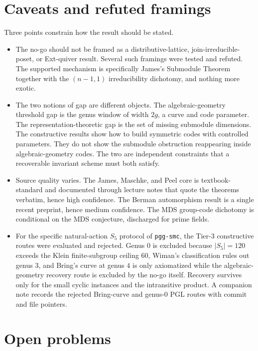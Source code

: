 \documentclass[11pt]{article}
\newcommand{\Sym}{S}
\begin{document}
\section{Caveats and refuted framings}

Three points constrain how the result should be stated.

\begin{itemize}[leftmargin=1.4em]
\item The no-go should not be framed as a distributive-lattice, join-irreducible-poset, or
  Ext-quiver result. Several such framings were tested and refuted. The supported mechanism
  is specifically James's Submodule Theorem together with the $(n-1,1)$ irreducibility
  dichotomy, and nothing more exotic.
\item The two notions of gap are different objects. The algebraic-geometry threshold gap is
  the genus window of width $2g$, a curve and code parameter. The representation-theoretic
  gap is the set of missing submodule dimensions. The constructive results show how to
  build symmetric codes with controlled parameters. They do not show the submodule
  obstruction reappearing inside algebraic-geometry codes. The two are independent
  constraints that a recoverable invariant scheme must both satisfy.
\item Source quality varies. The James, Maschke, and Peel core is textbook-standard and
  documented through lecture notes that quote the theorems verbatim, hence high confidence.
  The Berman automorphism result is a single recent preprint, hence medium confidence. The
  MDS group-code dichotomy is conditional on the MDS conjecture, discharged for prime
  fields.
\item For the specific natural-action $\Sym_5$ protocol of \texttt{pgg-smc}, the Tier-3
  constructive routes were evaluated and rejected. Genus $0$ is excluded because
  $|\Sym_5| = 120$ exceeds the Klein finite-subgroup ceiling $60$, Wiman's classification
  rules out genus $3$, and Bring's curve at genus $4$ is only axiomatized while the
  algebraic-geometry recovery route is excluded by the no-go itself. Recovery survives only
  for the small cyclic instances and the intransitive product. A companion note records the
  rejected Bring-curve and genus-$0$ PGL routes with commit and file pointers.
\end{itemize}

\section{Open problems}
\end{document}
